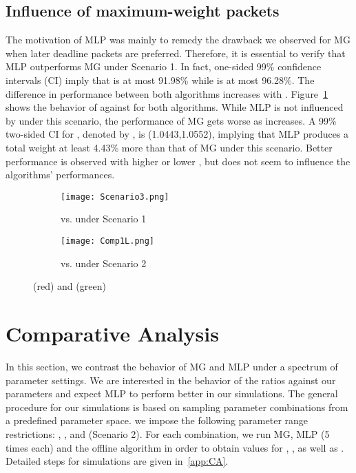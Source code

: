 \documentclass[oribibl]{llncs}
\begin{document}
\subsection{Influence of maximum-weight packets}
The motivation of MLP was mainly to remedy the drawback we observed
for MG when later deadline packets are preferred. Therefore, it is
essential to verify that MLP outperforms MG under Scenario 1. In fact,
one-sided 99\% confidence intervals (CI) imply that  is at
most 91.98\% while  is at most 96.28\%. The difference in
performance between both algorithms increases with
. Figure~\ref{fig:Scenario3} shows the behavior of 
against  for both algorithms. While MLP is not influenced by
 under this scenario, the performance of MG gets worse as
 increases. A 99\% two-sided CI for
, denoted by , is
(1.0443,1.0552), implying that MLP produces a total weight at least
4.43\% more than that of MG under this scenario. Better performance is
observed with higher  or lower , but
 does not seem to influence the algorithms' performances.
\vspace{-13pt}
\begin{figure}
\begin{subfigure}{.47\textwidth}
  \centering
\texttt{[image: Scenario3.png]}
\caption{ vs.  under Scenario 1}
\label{fig:Scenario3}
\end{subfigure}
\hfill
\begin{subfigure}{.47\textwidth}
  \centering 
\texttt{[image: Comp1L.png]}
\caption{ vs.  under Scenario 2}
\label{fig:CompL}
\end{subfigure}
\caption{(red) and (green)} 
\end{figure}

\vspace{-30pt}
\section{Comparative Analysis}
\label{sec:CA}
\vspace{-8pt}
In this section, we contrast the behavior of MG and MLP under a
spectrum of parameter settings. We are interested in the behavior of
the ratios against our parameters and expect MLP to perform better in
our simulations. The general procedure for our simulations is based on
sampling parameter combinations from a predefined parameter space. 
we impose the following parameter range restrictions: , ,  and  (Scenario 2). For
each combination, we run MG, MLP (5 times each) and the offline
algorithm in order to obtain values for , , as
well as . Detailed steps
for simulations are given in~\ref{app:CA}. 
\end{document}
